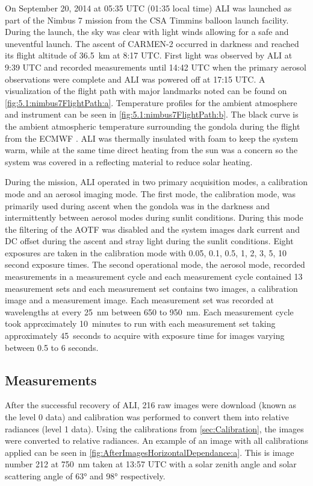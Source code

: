 \documentclass[12pt]{article}
\begin{document}
On September 20, 2014 at 05:35 UTC (01:35 local time) ALI was launched as part of the Nimbus 7 mission from the CSA Timmins balloon launch facility. During the launch, the sky was clear with light winds allowing for a safe and uneventful launch. The ascent of CARMEN-2 occurred in darkness and reached its flight altitude of 36.5~km at 8:17 UTC. First light was observed by ALI at 9:39 UTC and recorded measurements until 14:42 UTC when the primary aerosol observations were complete and ALI was powered off at 17:15 UTC. A visualization of the flight path with major landmarks noted can be found on \autoref{fig:5.1:nimbus7FlightPath:a}. Temperature profiles for the ambient atmosphere and instrument can be seen in \autoref{fig:5.1:nimbus7FlightPath:b}. The black curve is the ambient atmospheric temperature surrounding the gondola during the flight from the ECMWF \citep{Molteni1996}. ALI was thermally insulated with foam to keep the system warm, while at the same time direct heating from the sun was a concern so the system was covered in a reflecting material to reduce solar heating.

During the mission, ALI operated in two primary acquisition modes, a calibration mode and an aerosol imaging mode. The first mode, the calibration mode, was primarily used during ascent when the gondola was in the darkness and intermittently between aerosol modes during sunlit conditions. During this mode the filtering of the AOTF was disabled and the system images dark current and DC offset during the ascent and stray light during the sunlit conditions. Eight exposures are taken in the calibration mode with 0.05, 0.1, 0.5, 1, 2, 3, 5, 10 second exposure times. The second operational mode, the aerosol mode, recorded measurements in a measurement cycle and each measurement cycle contained 13 measurement sets and each measurement set contains two images, a calibration image and a measurement image. Each measurement set was recorded at wavelengths at every 25~nm between 650 to 950~nm. Each measurement cycle took approximately 10~minutes to run with each measurement set taking approximately 45~seconds to acquire with exposure time for images varying between 0.5 to 6 seconds.

\subsection{Measurements}

After the successful recovery of ALI, 216 raw images were download (known as the level 0 data) and calibration was performed to convert them into relative radiances (level 1 data). Using the calibrations from \autoref{sec:Calibration}, the images were converted to relative radiances. An example of an image with all calibrations applied can be seen in \autoref{fig:AfterImagesHorizontalDependance:a}. This is image number 212 at 750~nm taken at 13:57 UTC with a solar zenith angle and solar scattering angle of 63\si{\degree} and 98\si{\degree} respectively.
\end{document}
